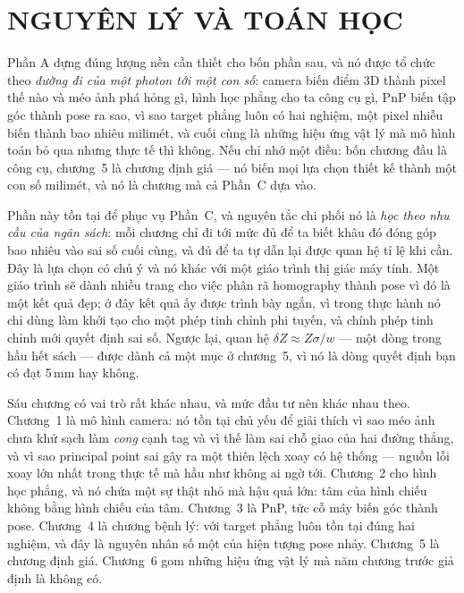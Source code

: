 \documentclass[../marker.tex]{subfiles}
\begin{document}
\part{NGUYÊN LÝ VÀ TOÁN HỌC}
\begin{tomtat}
Phần A dựng đúng lượng nền cần thiết cho bốn phần sau, và nó được tổ chức theo \emph{đường đi của một photon tới một con số}: camera biến điểm 3D thành pixel thế nào và méo ảnh phá hỏng gì, hình học phẳng cho ta công cụ gì, PnP biến tập góc thành pose ra sao, vì sao target phẳng luôn có hai nghiệm, một pixel nhiễu biến thành bao nhiêu milimét, và cuối cùng là những hiệu ứng vật lý mà mô hình toán bỏ qua nhưng thực tế thì không. Nếu chỉ nhớ một điều: bốn chương đầu là công cụ, chương~5 là chương định giá --- nó biến mọi lựa chọn thiết kế thành một con số milimét, và nó là chương mà cả Phần~C dựa vào.
\end{tomtat}

Phần này tồn tại để phục vụ Phần~C, và nguyên tắc chi phối nó là \emph{học theo nhu cầu của ngân sách}: mỗi chương chỉ đi tới mức đủ để ta biết khâu đó đóng góp bao nhiêu vào sai số cuối cùng, và đủ để ta tự dẫn lại được quan hệ tỉ lệ khi cần. Đây là lựa chọn có chủ ý và nó khác với một giáo trình thị giác máy tính. Một giáo trình sẽ dành nhiều trang cho việc phân rã homography thành pose vì đó là một kết quả đẹp; ở đây kết quả ấy được trình bày ngắn, vì trong thực hành nó chỉ dùng làm khởi tạo cho một phép tinh chỉnh phi tuyến, và chính phép tinh chỉnh mới quyết định sai số. Ngược lại, quan hệ \(\delta Z \approx Z\sigma/w\) --- một dòng trong hầu hết sách --- được dành cả một mục ở chương~5, vì nó là dòng quyết định bạn có đạt 5\,mm hay không.

Sáu chương có vai trò rất khác nhau, và mức đầu tư nên khác nhau theo. Chương~1 là mô hình camera: nó tồn tại chủ yếu để giải thích vì sao méo ảnh chưa khử sạch làm \emph{cong} cạnh tag và vì thế làm sai chỗ giao của hai đường thẳng, và vì sao principal point sai gây ra một thiên lệch xoay có hệ thống --- nguồn lỗi xoay lớn nhất trong thực tế mà hầu như không ai ngờ tới. Chương~2 cho hình học phẳng, và nó chứa một sự thật nhỏ mà hậu quả lớn: tâm của hình chiếu không bằng hình chiếu của tâm. Chương~3 là PnP, tức cỗ máy biến góc thành pose. Chương~4 là chương bệnh lý: với target phẳng luôn tồn tại đúng hai nghiệm, và đây là nguyên nhân số một của hiện tượng pose nhảy. Chương~5 là chương định giá. Chương~6 gom những hiệu ứng vật lý mà năm chương trước giả định là không có.
\end{document}
